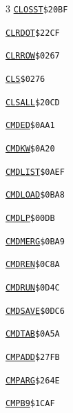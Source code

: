 \begin{multicols}{3}
\noindent\hyperlink{l:CLOSST}{\texttt{CLOSST}}\hfill\texttt{\$20BF~\phantom{000}\llap{\pageref{l:CLOSST}}}\par
\noindent\hyperlink{l:CLRDOT}{\texttt{CLRDOT}}\hfill\texttt{\$22CF~\phantom{000}\llap{\pageref{l:CLRDOT}}}\par
\noindent\hyperlink{l:CLRROW}{\texttt{CLRROW}}\hfill\texttt{\$0267~\phantom{000}\llap{\pageref{l:CLRROW}}}\par
\noindent\hyperlink{l:CLS}{\texttt{CLS}}\hfill\texttt{\$0276~\phantom{000}\llap{\pageref{l:CLS}}}\par
\noindent\hyperlink{l:CLSALL}{\texttt{CLSALL}}\hfill\texttt{\$20CD~\phantom{000}\llap{\pageref{l:CLSALL}}}\par
\noindent\hyperlink{l:CMDED}{\texttt{CMDED}}\hfill\texttt{\$0AA1~\phantom{000}\llap{\pageref{l:CMDED}}}\par
\noindent\hyperlink{l:CMDKW}{\texttt{CMDKW}}\hfill\texttt{\$0A20~\phantom{000}\llap{\pageref{l:CMDKW}}}\par
\noindent\hyperlink{l:CMDLIST}{\texttt{CMDLIST}}\hfill\texttt{\$0AEF~\phantom{000}\llap{\pageref{l:CMDLIST}}}\par
\noindent\hyperlink{l:CMDLOAD}{\texttt{CMDLOAD}}\hfill\texttt{\$0BA8~\phantom{000}\llap{\pageref{l:CMDLOAD}}}\par
\noindent\hyperlink{l:CMDLP}{\texttt{CMDLP}}\hfill\texttt{\$00DB~\phantom{000}\llap{\pageref{l:CMDLP}}}\par
\noindent\hyperlink{l:CMDMERG}{\texttt{CMDMERG}}\hfill\texttt{\$0BA9~\phantom{000}\llap{\pageref{l:CMDMERG}}}\par
\noindent\hyperlink{l:CMDREN}{\texttt{CMDREN}}\hfill\texttt{\$0C8A~\phantom{000}\llap{\pageref{l:CMDREN}}}\par
\noindent\hyperlink{l:CMDRUN}{\texttt{CMDRUN}}\hfill\texttt{\$0D4C~\phantom{000}\llap{\pageref{l:CMDRUN}}}\par
\noindent\hyperlink{l:CMDSAVE}{\texttt{CMDSAVE}}\hfill\texttt{\$0DC6~\phantom{000}\llap{\pageref{l:CMDSAVE}}}\par
\noindent\hyperlink{l:CMDTAB}{\texttt{CMDTAB}}\hfill\texttt{\$0A5A~\phantom{000}\llap{\pageref{l:CMDTAB}}}\par
\noindent\hyperlink{l:CMPADD}{\texttt{CMPADD}}\hfill\texttt{\$27FB~\phantom{000}\llap{\pageref{l:CMPADD}}}\par
\noindent\hyperlink{l:CMPARG}{\texttt{CMPARG}}\hfill\texttt{\$264E~\phantom{000}\llap{\pageref{l:CMPARG}}}\par
\noindent\hyperlink{l:CMPB9}{\texttt{CMPB9}}\hfill\texttt{\$1CAF~\phantom{000}\llap{\pageref{l:CMPB9}}}\par

\end{multicols}
